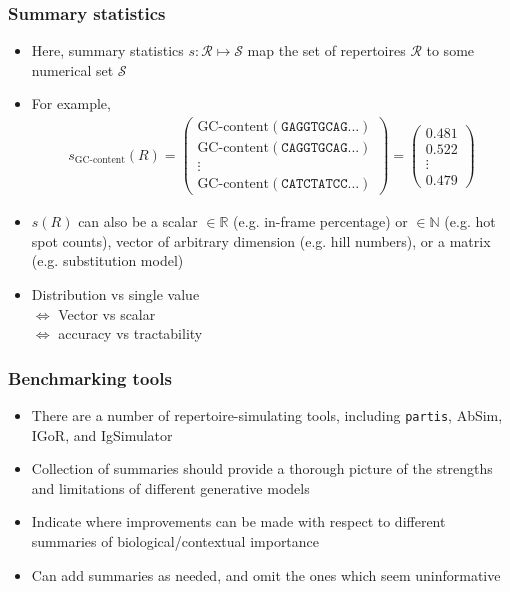 \documentclass[mathserif,compress]{beamer}
\newcommand*\reals{\mathbb{R}}
\newcommand*\naturals{\mathbb{N}}
\newcommand*\ba{\[ \begin{aligned}}
\newcommand*\ea{\end{aligned} \]}
\renewcommand\;{\,}
\begin{document}
\begin{frame}\frametitle{Summary statistics}
\begin{itemize}
\item
Here, summary statistics $s : \mathcal R \mapsto \mathcal S$ map the set of repertoires $\mathcal R$  to some numerical set $\mathcal S$
\medskip
\item
For example,
\ba
s_\text{GC-content}(R) =
\left(\begin{matrix}
\text{GC-content}(\mathtt{GAGGTGCAG...}) \\
\text{GC-content}(\mathtt{CAGGTGCAG...}) \\
\vdots \\
\text{GC-content}(\mathtt{CATCTATCC...})
\end{matrix} \right) = \begin{pmatrix} 0.481 \\ 0.522 \\ \vdots \\ 0.479  \end{pmatrix}
\ea
\item
$s(R)$ can also be a scalar $\in \reals$ (e.g. in-frame percentage) or $\in \naturals$ (e.g. hot spot counts), vector of arbitrary dimension (e.g. hill numbers), 
or a matrix (e.g. substitution model)
\medskip
\item
Distribution vs single value \\
$\iff$ Vector vs scalar
\\ $\iff$ accuracy vs tractability
\end{itemize}
\end{frame}

\begin{frame}\frametitle{Benchmarking tools}
\begin{itemize}
\item
There are a number of repertoire-simulating tools, including \texttt{partis}, AbSim, IGoR, and IgSimulator
\bigskip
\item
Collection of summaries should provide a thorough picture of the strengths and limitations of different generative models
\bigskip
\item
Indicate where improvements can be made with respect to different summaries of biological/contextual importance
\bigskip
\item
Can add summaries as needed, and omit the ones which seem uninformative
\end{itemize}
\end{frame}
\end{document}
